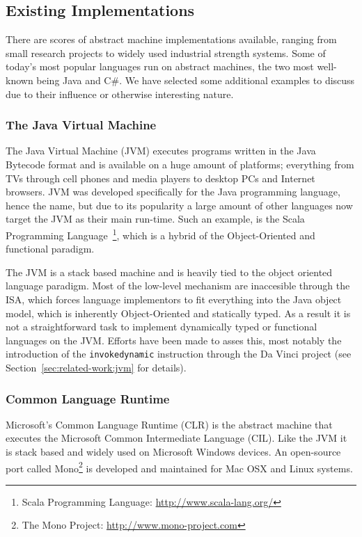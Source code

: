 \subsection{Existing Implementations}

There are scores of abstract machine implementations available, ranging from
small research projects to widely used industrial strength systems. Some of
today's most popular languages run on abstract machines, the two most well-known
being Java and C\#\cite{langpop}. We have selected some additional examples to
discuss due to their influence or otherwise interesting nature.

\subsubsection{The Java Virtual Machine}

The Java Virtual Machine (JVM) executes programs written in the Java Bytecode
format and is available on a huge amount of platforms; everything from TVs
through cell phones and media players to desktop PCs and Internet
browsers\cite{aboutjava}. JVM was developed specifically for the Java
programming language, hence the name, but due to its popularity a large amount
of other languages now target the JVM as their main run-time. Such an example,
is the Scala Programming Language~\footnote{Scala Programming Language:
  \url{http://www.scala-lang.org/}}, which is a hybrid of the Object-Oriented
and functional paradigm.

The JVM is a stack based machine and is heavily tied to the object oriented
language paradigm. Most of the low-level mechanism are inaccesible through the
ISA, which forces language implementors to fit everything into the Java object
model, which is inherently Object-Oriented and statically typed. As a result it
is not a straightforward task to implement dynamically typed or functional
languages on the JVM. Efforts have been made to asses this, most notably the
introduction of the \texttt{invokedynamic} instruction through the Da Vinci
project (see Section~\ref{sec:related-work:jvm} for details).

\subsubsection{Common Language Runtime}

Microsoft's Common Language Runtime (CLR) is the abstract machine that executes
the Microsoft Common Intermediate Language (CIL). Like the JVM it is stack based
and widely used on Microsoft Windows devices. An open-source port called
Mono\footnote{The Mono Project: \url{http://www.mono-project.com}} is developed
and maintained for Mac OSX and Linux systems.

